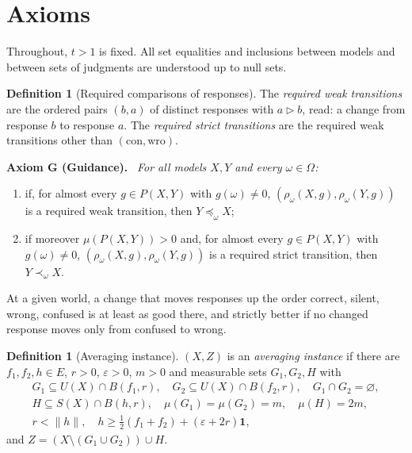 \documentclass[11pt]{article}
\theoremstyle{definition}
\newtheorem{definition}[theorem]{Definition}
\newenvironment{axiom}[1]{\par\medskip\noindent\textbf{Axiom #1.}\ \itshape}{\par\medskip}
\newcommand{\one}{\mathbf 1}
\newcommand{\wro}{\mathrm{wro}}
\newcommand{\con}{\mathrm{con}}
\begin{document}
\section{Axioms}\label{sec:axioms}

Throughout, $t>1$ is fixed. All set equalities and inclusions between models and between sets of judgments are understood up to null sets.

\begin{definition}[Required comparisons of responses]\label{def:required}
The \emph{required weak transitions} are the ordered pairs $(b,a)$ of distinct responses with $a\rhd b$, read: a change from response $b$ to response $a$. The \emph{required strict transitions} are the required weak transitions other than $(\con,\wro)$.
\end{definition}

\begin{axiom}{G (Guidance)}
For all models $X,Y$ and every $\omega\in\Omega$:
\begin{enumerate}[label=(\roman*)]
\item if, for almost every $g\in P(X,Y)$ with $g(\omega)\ne0$, $(\rho_\omega(X,g),\rho_\omega(Y,g))$ is a required weak transition, then $Y\preceq_\omega X$;
\item if moreover $\mu(P(X,Y))>0$ and, for almost every $g\in P(X,Y)$ with $g(\omega)\ne0$, $(\rho_\omega(X,g),\rho_\omega(Y,g))$ is a required strict transition, then $Y\prec_\omega X$.
\end{enumerate}
\end{axiom}
\noindent At a given world, a change that moves responses up the order correct, silent, wrong, confused is at least as good there, and strictly better if no changed response moves only from confused to wrong.

\begin{definition}[Averaging instance]\label{def:AV}
$(X,Z)$ is an \emph{averaging instance} if there are $f_1,f_2,h\in E$, $r>0$, $\varepsilon>0$, $m>0$ and measurable sets $G_1,G_2,H$ with
\begin{gather*}
G_1\subseteq U(X)\cap B(f_1,r),\quad G_2\subseteq U(X)\cap B(f_2,r),\quad G_1\cap G_2=\varnothing,\\
H\subseteq S(X)\cap B(h,r),\quad \mu(G_1)=\mu(G_2)=m,\quad \mu(H)=2m,\\
r<\|h\|,\quad h\ge\tfrac12(f_1+f_2)+(\varepsilon+2r)\one,
\end{gather*}
and $Z=(X\setminus(G_1\cup G_2))\cup H$.
\end{definition}
\end{document}
